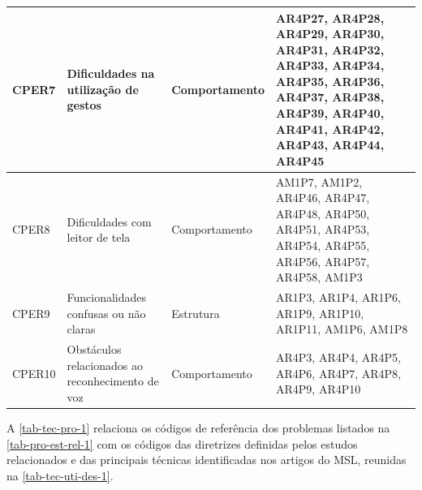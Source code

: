 \begin{table}[htb]
\begin{center}
\begin{tabular}{p{1.1cm}|p{4.0cm}|p{2.4cm}|p{6.7cm}}
            \hline
            CPER7           & Dificuldades na utilização de gestos                           & Comportamento                & AR4P27, AR4P28, AR4P29, AR4P30, AR4P31, AR4P32, AR4P33, AR4P34, AR4P35, AR4P36, AR4P37, AR4P38, AR4P39, AR4P40, AR4P41, AR4P42, AR4P43, AR4P44, AR4P45 \\
            \hline
            CPER8           & Dificuldades com leitor de tela                                & Comportamento                & AM1P7, AM1P2, AR4P46, AR4P47, AR4P48, AR4P50, AR4P51, AR4P53, AR4P54, AR4P55, AR4P56, AR4P57, AR4P58, AM1P3                                            \\
            \hline
            CPER9           & Funcionalidades confusas ou não claras                         & Estrutura                    & AR1P3, AR1P4, AR1P6, AR1P9, AR1P10, AR1P11, AM1P6, AM1P8                                                                                               \\
            \hline
            CPER10          & Obstáculos relacionados ao reconhecimento de voz               & Comportamento                & AR4P3, AR4P4, AR4P5, AR4P6, AR4P7, AR4P8, AR4P9, AR4P10                                                                                                \\
        \end{tabular}
    \end{center}
\end{table}
A \autoref{tab-tec-pro-1} relaciona os códigos de referência dos problemas listados na
\autoref{tab-pro-est-rel-1} com os códigos das diretrizes definidas pelos estudos relacionados e das principais
técnicas identificadas nos artigos do MSL, reunidas na \autoref{tab-tec-uti-des-1}.

